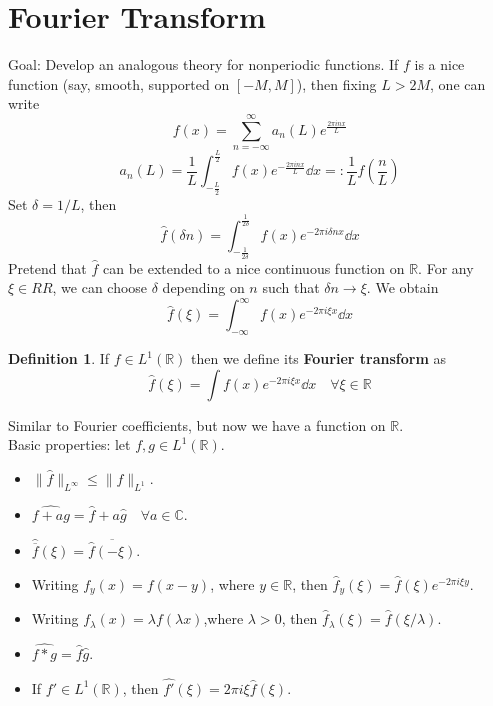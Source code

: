 \documentclass{article}
\theoremstyle{definition}
\newtheorem{dfn}{Definition}
\newcommand{\CC}{\mathbb C}
\newcommand{\RR}{\mathbb R}
\begin{document}
\section{Fourier Transform}

Goal: Develop an analogous theory for nonperiodic functions.
If $f$ is a nice function (say, smooth, supported on $[-M, M]$), then fixing $L > 2M$, one can write
\[
	f(x) = \sum_{n = -\infty}^\infty a_n(L) e^{ \frac{2 \pi i n x}{L}}
\]
\[
	a_n(L) = \frac{1}{L} \int_{-\frac{L}{2}}^{\frac{L}{2}} f(x) e^{-\frac{2 \pi i n x}{L}} \dd{x} =: \frac{1}{L} \widehat{f} \left( \frac{n}{L} \right)
\]
Set $\delta = 1/L$, then
\[
	\widehat{f}(\delta n) = \int_{- \frac{1}{2 \delta}}^{\frac{1}{2 \delta}} f(x) e^{- 2 \pi i \delta n x} \dd{x}
\]
Pretend that $\widehat{f}$ can be extended to a nice continuous function on $\RR$.
For any $\xi \in RR$, we can choose $\delta$ depending on $n$ such that $\delta n \to \xi$.
We obtain
\[
	\widehat{f}(\xi) = \int_{- \infty}^\infty f(x) e^{- 2 \pi i \xi x} \dd{x}
\]

\begin{dfn}
	If $f \in L^1(\RR)$ then we define its \textbf{Fourier transform} as
	\[
		\widehat{f}(\xi) = \int f(x) e^{- 2 \pi i \xi x} \dd{x} \quad \forall \xi \in \RR
	\]
\end{dfn}

Similar to Fourier coefficients, but now we have a function on $\RR$.\\
Basic properties: let $f, g \in L^1(\RR)$.
\begin{itemize}
	\item $\|\widehat{f}\|_{L^\infty} \leq \|f\|_{L^1}$.	

	\item $\widehat{f + ag} = \widehat{f} + a \widehat{g} \quad \forall a \in \CC$.

	\item $\widehat{\overline{f}}(\xi) = \overline{\widehat{f}(- \xi)}$.

	\item Writing $f_y(x) = f(x - y)$, where $y \in \RR$, then $\widehat{f}_y (\xi) = \widehat{f}(\xi) e^{- 2 \pi i \xi y}$.

	\item Writing $f_\lambda(x) = \lambda f(\lambda x)$,where $\lambda > 0$, then $\widehat{f}_\lambda(\xi) = \widehat{f}(\xi/\lambda)$.

	\item $\widehat{f * g} = \widehat{f} \widehat{g}$.

	\item If $f' \in L^1(\RR)$, then $\widehat{f'}(\xi) = 2 \pi i \xi \widehat{f}(\xi)$.
\end{itemize}
\end{document}
